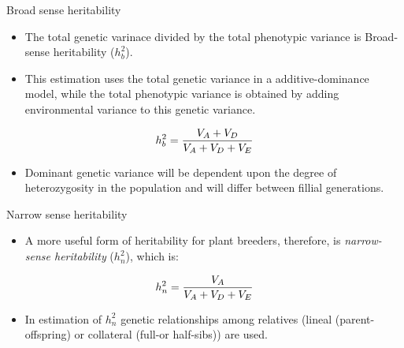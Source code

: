 \documentclass[11pt,ignorenonframetext,aspectratio=169]{beamer}
\providecommand{\tightlist}{%
  \setlength{\itemsep}{0pt}\setlength{\parskip}{0pt}}
\begin{document}
\begin{frame}{}
\protect\hypertarget{section-10}{}
\begin{block}{Broad sense heritability}
\protect\hypertarget{broad-sense-heritability}{}
\footnotesize

\begin{itemize}
\tightlist
\item
  The total genetic varinace divided by the total phenotypic variance is
  Broad-sense heritability (\(h_b^2\)).
\item
  This estimation uses the total genetic variance in a
  additive-dominance model, while the total phenotypic variance is
  obtained by adding environmental variance to this genetic variance.
\end{itemize}

\[
\small
h_b^2 = \frac{V_A + V_D}{V_A + V_D + V_E}
\]

\begin{itemize}
\tightlist
\item
  Dominant genetic variance will be dependent upon the degree of
  heterozygosity in the population and will differ between fillial
  generations.
\end{itemize}
\end{block}

\begin{block}{Narrow sense heritability}
\protect\hypertarget{narrow-sense-heritability}{}
\footnotesize

\begin{itemize}
\tightlist
\item
  A more useful form of heritability for plant breeders, therefore, is
  \emph{narrow-sense heritability} (\(h_n^2\)), which is:
\end{itemize}

\[
\small
h_n^2 = \frac{V_A}{V_A+V_D+V_E}
\]

\begin{itemize}
\tightlist
\item
  In estimation of \(h^2_n\) genetic relationships among relatives
  (lineal (parent-offspring) or collateral (full-or half-sibs)) are
  used.
\end{itemize}
\end{block}
\end{frame}
\end{document}
